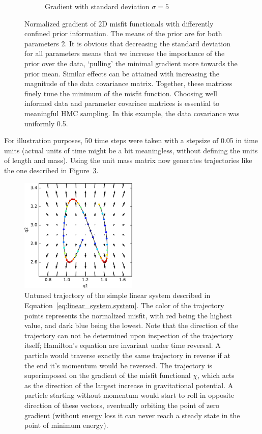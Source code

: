 \begin{figure}
\begin{subfigure}{.5\textwidth}
		\caption{Gradient with standard deviation $\sigma = 5$}
		\label{fig:linear_system.prior_influence.wide}
	\end{subfigure}
	\caption{Normalized gradient of 2D misfit functionals with differently confined prior information. The means of the prior are for both parameters 2. It is obvious that decreasing the standard deviation for all parameters means that we increase the importance of the prior over the data, `pulling' the minimal gradient more towards the prior mean. Similar effects can be attained with increasing the magnitude of the data covariance matrix. Together, these matrices finely tune the minimum of the misfit function. Choosing well informed data and parameter covariace matrices is essential to meaningful \gls{HMC} sampling. In this example, the data covariance was uniformly 0.5.}
	\label{fig:linear_system.prior_influence}
\end{figure}

For illustration purposes, 50 time steps were taken with a stepsize of 0.05 in time units (actual units of time might be a bit meaningless, without defining the units of length and mass). Using the unit mass matrix now generates trajectories like the one described in Figure~\ref{fig:linear_system.trajectory_simple}. 

\begin{figure}
	\centering

	\includegraphics[width=0.5\textwidth]{figures/linear_systems/trajectory_simple}

	\caption{Untuned trajectory of the simple linear system described in Equation~\eqref{eq:linear_system.system}. The color of the trajectory points represents the normalized misfit, with red being the highest value, and dark blue being the lowest. Note that the direction of the trajectory can not be determined upon inspection of the trajectory itself; Hamilton's equation are invariant under time reversal. A particle would traverse exactly the same trajectory in reverse if at the end it's momentum would be reversed. The trajectory is superimposed on the gradient of the misfit functional $\chi$, which acts as the direction of the largest increase in gravitational potential. A particle starting without momentum would start to roll in opposite direction of these vectors, eventually orbiting the point of zero gradient (without energy loss it can never reach a steady state in the point of minimum energy).}
	\label{fig:linear_system.trajectory_simple}
\end{figure}	

